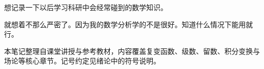 想记录一下以后学习科研中会经常碰到的数学知识。

就想着不那么严密了。因为我的数学分析学的不是很好。知道什么情况下能用就行。

本笔记整理自课堂讲授与参考教材，内容覆盖复变函数、级数、留数、积分变换与场论等核心章节。记号约定见绪论中的符号说明。

